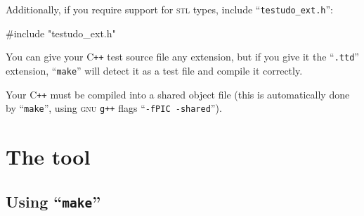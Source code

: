 \documentclass[twoside, a4paper, article]{memoir}
\newcommand*\Cpp{C\texttt{++}}
\begin{document}
Additionally, if you require support for \textsc{stl} types, include
``\texttt{testudo\_ext.h}'':
\begin{cpplisting}
#include "testudo_ext.h"
\end{cpplisting}

You can give your \Cpp{} test source file any extension, but if you give it the
``\texttt{.ttd}'' extension, ``\texttt{make}'' will detect it as a test file
and compile it correctly.

Your \Cpp{} must be compiled into a shared object file (this is automatically
done by ``\texttt{make}'', using \textsc{gnu} \texttt{g++} flags
``\texttt{-fPIC -shared}'').

\section{The tool}

\subsection{Using ``\texttt{make}''}
\label{sec:using-make}
\end{document}

